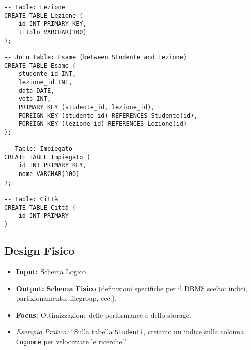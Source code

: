 \documentclass{article}
\begin{document}
\begin{itemize}
\begin{verbatim}
-- Table: Lezione
CREATE TABLE Lezione (
	id INT PRIMARY KEY,
	titolo VARCHAR(100)
);

-- Join Table: Esame (between Studente and Lezione)
CREATE TABLE Esame (
	studente_id INT,
	lezione_id INT,
	data DATE,
	voto INT,
	PRIMARY KEY (studente_id, lezione_id),
	FOREIGN KEY (studente_id) REFERENCES Studente(id),
	FOREIGN KEY (lezione_id) REFERENCES Lezione(id)
);

-- Table: Impiegato
CREATE TABLE Impiegato (
	id INT PRIMARY KEY,
	nome VARCHAR(100)
);

-- Table: Città
CREATE TABLE Città (
	id INT PRIMARY
)
		\end{verbatim}
	\end{itemize}
	
	\subsection{Design Fisico}
	\begin{itemize}
		\item \textbf{Input:} Schema Logico.
		\item \textbf{Output:} \textbf{Schema Fisico} (definizioni specifiche per il DBMS scelto: indici, partizionamento, filegroup, ecc.).
		\item \textbf{Focus:} Ottimizzazione delle performance e dello storage.
		\item \textit{Esempio Pratico:} ``Sulla tabella \texttt{Studenti}, creiamo un indice sulla colonna \texttt{Cognome} per velocizzare le ricerche.''
	\end{itemize}
	
\end{document}

